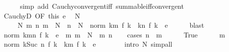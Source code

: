 \begin{isabellebody}
\ \ \ \ \isamarkupfalse%
\ {\isacharparenleft}{\kern0pt}simp\ add{\isacharcolon}{\kern0pt}\ Cauchy{\isacharunderscore}{\kern0pt}convergent{\isacharunderscore}{\kern0pt}iff\ summable{\isacharunderscore}{\kern0pt}iff{\isacharunderscore}{\kern0pt}convergent{\isacharparenright}{\kern0pt}\isanewline
\ \ \isamarkupfalse%
\ CauchyD\ {\isacharbrackleft}{\kern0pt}OF\ this\ e{\isacharbrackright}{\kern0pt}\ \isamarkupfalse%
\ N\isanewline
\ \ \ \ \ N{\isacharcolon}{\kern0pt}\ {\isachardoublequoteopen}{\isasymAnd}m\ n{\isachardot}{\kern0pt}\ m\ {\isasymge}\ N\ {\isasymLongrightarrow}\ n\ {\isasymge}\ N\ {\isasymLongrightarrow}\ norm\ {\isacharparenleft}{\kern0pt}{\isacharparenleft}{\kern0pt}{\isasymSum}k{\isacharless}{\kern0pt}m{\isachardot}{\kern0pt}\ f\ k{\isacharparenright}{\kern0pt}\ {\isacharminus}{\kern0pt}\ {\isacharparenleft}{\kern0pt}{\isasymSum}k{\isacharless}{\kern0pt}n{\isachardot}{\kern0pt}\ f\ k{\isacharparenright}{\kern0pt}{\isacharparenright}{\kern0pt}\ {\isacharless}{\kern0pt}\ e{\isachardoublequoteclose}\isanewline
\ \ \ \ \isamarkupfalse%
\ blast\isanewline
\ \ \isamarkupfalse%
\ {\isachardoublequoteopen}norm\ {\isacharparenleft}{\kern0pt}{\isasymSum}k{\isacharequal}{\kern0pt}m{\isachardot}{\kern0pt}{\isachardot}{\kern0pt}n{\isachardot}{\kern0pt}\ f\ k{\isacharparenright}{\kern0pt}\ {\isacharless}{\kern0pt}\ e{\isachardoublequoteclose}\ \ m{\isacharcolon}{\kern0pt}\ {\isachardoublequoteopen}m\ {\isasymge}\ N{\isachardoublequoteclose}\ \ m\ n\isanewline
\ \ \isamarkupfalse%
\ {\isacharparenleft}{\kern0pt}cases\ {\isachardoublequoteopen}n\ {\isasymge}\ m{\isachardoublequoteclose}{\isacharparenright}{\kern0pt}\isanewline
\ \ \ \ \isamarkupfalse%
\ True\isanewline
\ \ \ \ \isamarkupfalse%
\ m\ \isamarkupfalse%
\ {\isachardoublequoteopen}norm\ {\isacharparenleft}{\kern0pt}{\isacharparenleft}{\kern0pt}{\isasymSum}k{\isacharless}{\kern0pt}Suc\ n{\isachardot}{\kern0pt}\ f\ k{\isacharparenright}{\kern0pt}\ {\isacharminus}{\kern0pt}\ {\isacharparenleft}{\kern0pt}{\isasymSum}k{\isacharless}{\kern0pt}m{\isachardot}{\kern0pt}\ f\ k{\isacharparenright}{\kern0pt}{\isacharparenright}{\kern0pt}\ {\isacharless}{\kern0pt}\ e{\isachardoublequoteclose}\isanewline
\ \ \ \ \ \ \isamarkupfalse%
\ {\isacharparenleft}{\kern0pt}intro\ N{\isacharparenright}{\kern0pt}\ simp{\isacharunderscore}{\kern0pt}all\isanewline
\ \ \ \ \isamarkupfalse%
\ \isamarkupfalse%

\end{isabellebody}

